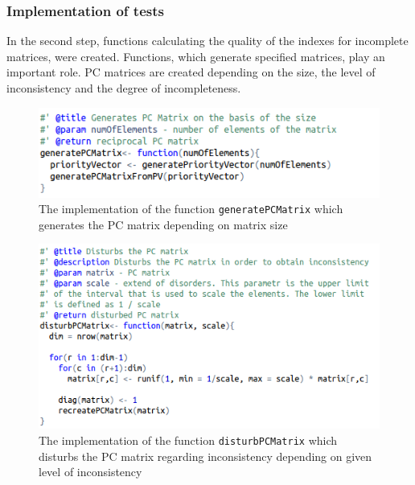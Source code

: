\subsubsection{Implementation of tests}
In the second step, functions calculating the quality of the indexes for incomplete matrices, were created. Functions, which generate specified matrices, play an important role. PC matrices are created depending on the size, the level of inconsistency and the degree of incompleteness.

\begin{figure}[h]
\centerline{\includegraphics[scale=0.75]{images/kod11.png}}
\caption{The implementation of the function \texttt{generatePCMatrix} which generates the PC matrix depending on matrix size}
\label{fig:rstudio}
\end{figure}

\begin{figure}[h]
\centerline{\includegraphics[scale=0.75]{images/kod12.png}}
\caption{The implementation of the function \texttt{disturbPCMatrix} which disturbs the PC matrix regarding inconsistency depending on given level of inconsistency}
\label{fig:rstudio}
\end{figure}

